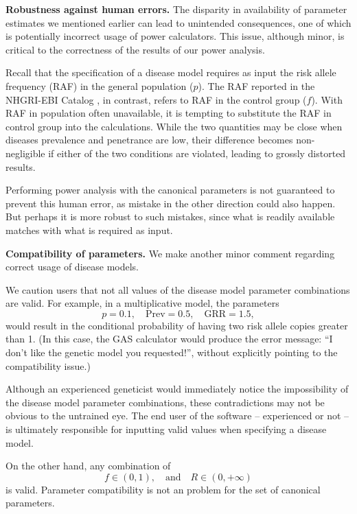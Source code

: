 \medskip\noindent
{\bf Robustness against human errors.}
The disparity in availability of parameter estimates we mentioned earlier can lead to unintended consequences, one of which is potentially incorrect usage of power calculators.
This issue, although minor, is critical to the correctness of the results of our power analysis.

Recall that the specification of a disease model requires as input the risk allele frequency (RAF) in the general population ($p$).
The RAF reported in the NHGRI-EBI Catalog \citep{macarthur2016new}, in contrast, refers to RAF in the control group ($f$).
With RAF in population often unavailable, it is tempting to substitute the RAF in control group into the calculations.
While the two quantities may be close when diseases prevalence and penetrance are low, their difference becomes non-negligible if either of the two conditions are violated, leading to grossly distorted results.

Performing power analysis with the canonical parameters is not guaranteed to prevent this human error, as mistake in the other direction could also happen.
But perhaps it is more robust to such mistakes, since what is readily available matches with what is required as input.

\medskip\noindent
{\bf Compatibility of parameters.}
We make another minor comment regarding correct usage of disease models.

We caution users that not all values of the disease model parameter combinations are valid.
For example, in a multiplicative model, the parameters 
\begin{equation*}
    p = 0.1, \quad \text{Prev} = 0.5, \quad \text{GRR} = 1.5,
\end{equation*}
would result in the conditional probability of having two risk allele copies greater than 1.
(In this case, the GAS calculator \citep{johnson2017gas} would produce the error message: ``I don't like the genetic model you requested!'', without explicitly pointing to the compatibility issue.)

Although an experienced geneticist would immediately notice the impossibility of the disease model parameter combinations, these contradictions may not be obvious to the untrained eye.
The end user of the software -- experienced or not -- is ultimately responsible for inputting valid values when specifying a disease model.

On the other hand, any combination of 
\begin{equation*}
    f\in(0,1), \quad \text{and} \quad R\in(0,+\infty)
\end{equation*}
is valid. 
Parameter compatibility is not an problem for the set of canonical parameters.

